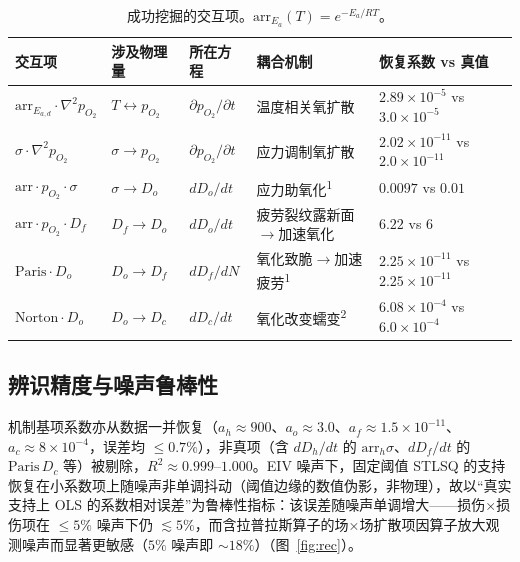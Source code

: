 \documentclass[11pt,a4paper]{article}
\begin{document}
\begin{table}[h]\centering\small
\caption{成功挖掘的交互项。$\mathrm{arr}_{E_a}(T)=e^{-E_a/RT}$。}
\label{tab:inter}
\begin{tabular}{>{\raggedright\arraybackslash}p{3.0cm} >{\raggedright\arraybackslash}p{2.1cm} >{\raggedright\arraybackslash}p{2.0cm} >{\raggedright\arraybackslash}p{4.5cm} >{\raggedright\arraybackslash}p{2.3cm}}
\toprule
交互项 & 涉及物理量 & 所在方程 & 耦合机制 & 恢复系数 vs 真值 \\
\midrule
$\mathrm{arr}_{E_{a,d}}\!\cdot\!\nabla^2 p_{O_2}$ & $T\!\leftrightarrow\!p_{O_2}$ & $\partial p_{O_2}/\partial t$ & 温度相关氧扩散 & $2.89\!\times\!10^{-5}$ vs $3.0\!\times\!10^{-5}$ \\
$\sigma\!\cdot\!\nabla^2 p_{O_2}$ & $\sigma\!\to\!p_{O_2}$ & $\partial p_{O_2}/\partial t$ & 应力调制氧扩散 & $2.02\!\times\!10^{-11}$ vs $2.0\!\times\!10^{-11}$ \\
$\mathrm{arr}\!\cdot\!p_{O_2}\!\cdot\!\sigma$ & $\sigma\!\to\!D_o$ & $dD_o/dt$ & 应力助氧化\textsuperscript{1} & $0.0097$ vs $0.01$ \\
$\mathrm{arr}\!\cdot\!p_{O_2}\!\cdot\!D_f$ & $D_f\!\to\!D_o$ & $dD_o/dt$ & 疲劳裂纹露新面$\to$加速氧化 & $6.22$ vs $6$ \\
$\mathrm{Paris}\!\cdot\!D_o$ & $D_o\!\to\!D_f$ & $dD_f/dN$ & 氧化致脆$\to$加速疲劳\textsuperscript{1} & $2.25\!\times\!10^{-11}$ vs $2.25\!\times\!10^{-11}$ \\
$\mathrm{Norton}\!\cdot\!D_o$ & $D_o\!\to\!D_c$ & $dD_c/dt$ & 氧化改变蠕变\textsuperscript{2} & $6.08\!\times\!10^{-4}$ vs $6.0\!\times\!10^{-4}$ \\
\bottomrule
\end{tabular}
\end{table}

\subsection{辨识精度与噪声鲁棒性}
机制基项系数亦从数据一并恢复（$a_h\approx 900$、$a_o\approx 3.0$、$a_f\approx 1.5\!\times\!10^{-11}$、$a_c\approx 8\!\times\!10^{-4}$，误差均 $\le 0.7\%$），非真项（含 $dD_h/dt$ 的 $\mathrm{arr}_h\sigma$、$dD_f/dt$ 的 $\mathrm{Paris}\,D_c$ 等）被剔除，$R^2\approx 0.999$--$1.000$。EIV 噪声下，固定阈值 STLSQ 的支持恢复在小系数项上随噪声非单调抖动（阈值边缘的数值伪影，非物理），故以“真实支持上 OLS 的系数相对误差”为鲁棒性指标：该误差随噪声单调增大——损伤×损伤项在 $\le 5\%$ 噪声下仍 $\lesssim 5\%$，而含拉普拉斯算子的场×场扩散项因算子放大观测噪声而显著更敏感（$5\%$ 噪声即 $\sim 18\%$）（图~\ref{fig:rec}）。
\end{document}
